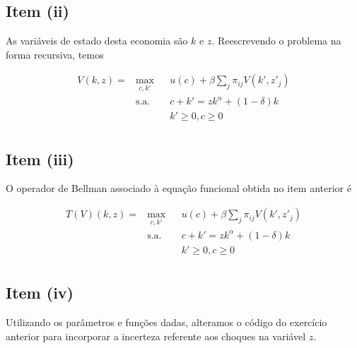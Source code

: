 \documentclass{article}
\begin{document}
\subsection*{Item (ii)}

As variáveis de estado desta economia são $k$ e $z$. Reescrevendo o problema na forma recursiva, temos

\begin{equation}
\begin{aligned}
V(k, z) = & \max_{c, k'} & & u(c) + \beta \sum_j \pi_{ij} V(k', z'_j) \\
& \text{s.a.} & &  c + k' = z k^\alpha + (1-\delta) k \\
& & &  k' \geq 0, c \geq 0 \,\, \\
\end{aligned}
\end{equation}

\subsection*{Item (iii)}

O operador de Bellman associado à equação funcional obtida no item anterior é

\begin{equation}
\begin{aligned}
T(V)(k, z) = & \max_{c, k'} & & u(c) + \beta \sum_j \pi_{ij} V(k', z'_j) \\
& \text{s.a.} & &  c + k' = z k^\alpha + (1-\delta) k \\
& & &  k' \geq 0, c \geq 0 \,\, \\
\end{aligned}
\end{equation}

\subsection*{Item (iv)}

Utilizando os parâmetros e funções dadas, alteramos o código do exercício anterior para
incorporar a incerteza referente aos choques na variável $z$.
\end{document}
